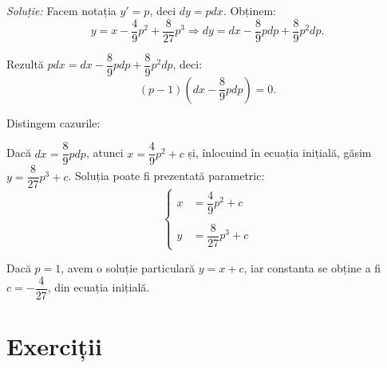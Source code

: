 \emph{Soluție:} Facem notația $y' = p$, deci $dy = pdx$. Obținem:
\[
  y = x - \frac{4}{9} p^2 + \frac{8}{27} p^3 \Rightarrow %
  dy = dx - \frac{8}{9} pdp + \frac{8}{9} p^2 dp.
\]

Rezultă $pdx = dx - \dfrac{8}{9} pdp + \dfrac{8}{9} p^2 dp$, deci:
\[
  (p - 1)(dx - \frac{8}{9} pdp) = 0.
\]

Distingem cazurile:

Dacă $dx = \dfrac{8}{9} pdp$, atunci $x = \dfrac{4}{9} p^2 + c$ și, înlocuind în
ecuația inițială, găsim $y = \dfrac{8}{27} p^3 + c$. Soluția poate fi prezentată parametric:
\[
  \begin{cases}
    x &= \dfrac{4}{9} p^2 + c \\
      & \\
    y &= \dfrac{8}{27} p^3 + c
  \end{cases}
\]

Dacă $p = 1$, avem o soluție particulară $y = x + c$, iar constanta se obține a fi $c = -\dfrac{4}{27}$,
din ecuația inițială.



\section{Exerciții}

